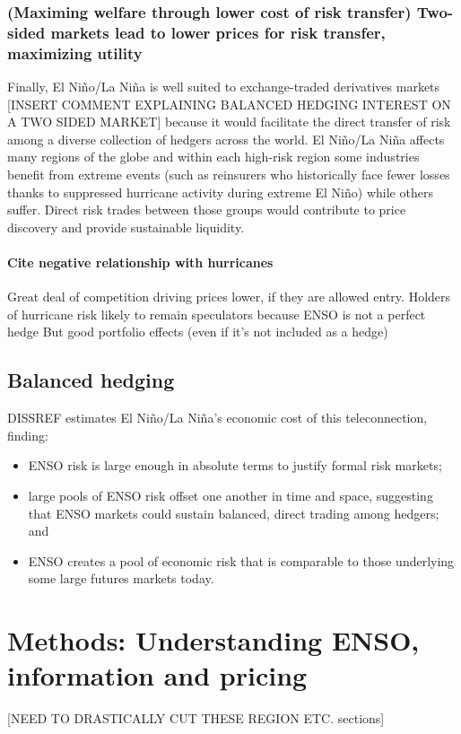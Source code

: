\documentclass[authoryear]{article}
\begin{document}
\subsubsection{(Maximing welfare through lower cost of risk transfer) Two-sided markets lead to lower prices for risk transfer, maximizing utility}
Finally, El Ni\~no/La Ni\~na is well suited to exchange-traded derivatives markets [INSERT COMMENT EXPLAINING BALANCED HEDGING INTEREST ON A TWO SIDED MARKET] because it would facilitate the direct transfer of risk among a diverse collection of hedgers across the world. El Ni\~no/La Ni\~na affects many regions of the globe and within each high-risk region some industries benefit from extreme events (such as reinsurers who historically face fewer losses thanks to suppressed hurricane activity during extreme El Ni\~no) while others suffer. Direct risk trades between those groups would contribute to price discovery and provide sustainable liquidity.

\paragraph{Cite negative relationship with hurricanes}
Great deal of competition driving prices lower, if they are allowed entry.
Holders of hurricane risk likely to remain speculators because ENSO is not a perfect hedge 
But good portfolio effects (even if it's not included as a hedge)


\subsection{Balanced hedging}

DISSREF estimates El Ni\~no/La Ni\~na's economic cost of this teleconnection, finding:
\begin{itemize} 
\item ENSO risk is large enough in absolute terms to justify formal risk markets;
\item large pools of ENSO risk offset one another in time and space, suggesting that ENSO markets could sustain balanced, direct trading among hedgers; and 
\item ENSO creates a pool of economic risk that is comparable to those underlying some large futures markets today.
\end{itemize}



\section{Methods: Understanding ENSO, information and pricing}
[NEED TO DRASTICALLY CUT THESE REGION ETC. sections]
\end{document}
